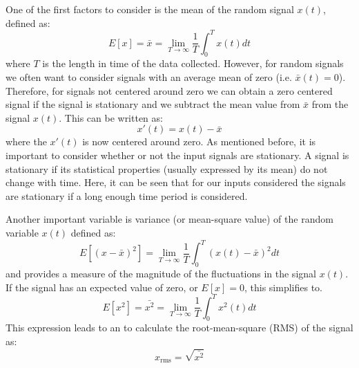 \documentclass[12pt,letter]{article}
\numberwithin{ex}{section} %
\numberwithin{re}{section} %
\begin{document}
One of the first factors to consider is the mean of the random signal $x(t)$, defined as:
\begin{equation}
E[x] = \bar{x} = \lim\limits_{T \rightarrow \infty} \frac{1}{T} \int_{0}^{T}x(t)dt
\end{equation}
where $T$ is the length in time of the data collected. However, for random signals we often want to consider signals with an average mean of zero (i.e. $\bar{x}(t)=0$). Therefore, for signals not centered around zero we can obtain a zero centered signal if the signal is stationary and we subtract the mean value from $\bar{x}$ from the signal $x(t)$. This can be written as:
\begin{equation}
x'(t) = x(t) - \bar{x}
\end{equation} 
where the $x'(t)$ is now centered around zero. As mentioned before, it is important to consider whether or not the input signals are stationary. A signal is stationary if its statistical properties (usually expressed by its mean) do not change with time. Here, it can be seen that for our inputs considered the signals are stationary if a long enough time period is considered. 

Another important variable is variance (or mean-square value) of the random variable $x(t)$ defined as:
\begin{equation}
E[(x-\bar{x})^2] = \lim\limits_{T \rightarrow \infty} \frac{1}{T} \int_{0}^{T}(x(t)-\bar{x})^2dt
\end{equation}
and provides a measure of the magnitude of the fluctuations in the signal $x(t)$. If the signal has an expected value of zero, or $E[x]=0$, this simplifies to. 
\begin{equation}
E[x^2] = \bar{x^2} = \lim\limits_{T \rightarrow \infty} \frac{1}{T} \int_{0}^{T}x^2(t)dt
\end{equation}
This expression leads to an to calculate the root-mean-square (RMS) of the signal as:
\begin{equation}
x_\text{rms} = \sqrt{\bar{x^2}} 
\end{equation}
\end{document}
